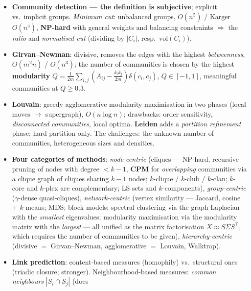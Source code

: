\documentclass[11pt,a4paper]{article}
\theoremstyle{definition}
\begin{document}
\begin{itemize}
      $=$ hubs, centers $=$ authorities; pruning $+$ core generation; it finds only the cores, neither
      the themes nor the hierarchy. \emph{Named entity communities}: a graph from co-occurrences in a
      sentence $\to$ triangles $\to$ cores $\to$ clustering by textual similarity.
\item \textbf{Community detection --- the definition is subjective}; explicit vs.\ implicit groups.
      \emph{Minimum cut}: unbalanced groups, $O(n^5)$ / Karger $O(n^4)$, \textbf{NP-hard} with general
      weights and balancing constraints $\Rightarrow$ the \emph{ratio} and \emph{normalised cut}
      (dividing by $|C_i|$, resp.\ $\mathrm{vol}(C_i)$).
\item \textbf{Girvan--Newman}: divisive, removes the edges with the highest \emph{betweenness},
      $O(m^2n)$ / $O(n^3)$; the number of communities is chosen by the highest \textbf{modularity}
      $Q=\frac{1}{2m}\sum_{i,j}(A_{ij}-\frac{k_ik_j}{2m})\delta(c_i,c_j)$, $Q\in[-1,1]$, meaningful
      communities at $Q\ge 0.3$.
\item \textbf{Louvain}: greedy agglomerative modularity maximisation in two phases (local moves $\to$
      supergraph), $O(n\log n)$; drawbacks: order sensitivity, \emph{disconnected communities}, local
      optima. \textbf{Leiden} adds a \emph{partition refinement} phase; hard partition only. The
      challenges: the unknown number of communities, heterogeneous sizes and densities.
\item \textbf{Four categories of methods}: \emph{node-centric} (cliques --- NP-hard, recursive pruning
      of nodes with degree $<k-1$, \textbf{CPM} for \emph{overlapping} communities via a clique graph
      of cliques sharing $k-1$ nodes; $k$-clique / $k$-club / $k$-clan; $k$-core and $k$-plex are
      complementary; LS sets and $k$-components), \emph{group-centric} ($\gamma$-dense quasi-cliques),
      \emph{network-centric} (vertex similarity --- Jaccard, cosine $+$ $k$-means; MDS; block models;
      spectral clustering via the graph Laplacian with the \emph{smallest} eigenvalues; modularity
      maximisation via the modularity matrix with the \emph{largest} --- all unified as the matrix
      factorisation $X\approx S\Sigma S^{\!\top}$, which requires the number of communities to be
      given), \emph{hierarchy-centric} (divisive $=$ Girvan--Newman, agglomerative $=$ Louvain,
      Walktrap).
\item \textbf{Link prediction}: content-based measures (homophily) vs.\ structural ones (triadic
      closure; stronger). Neighbourhood-based measures: \emph{common neighbours} $|S_i\cap S_j|$ (does

\end{itemize}
\end{document}
